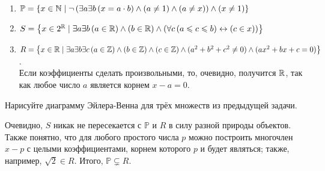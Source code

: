 \begin{Answer}
    \noindent
    \begin{enumerate}[label=\arabic*)]
    \item $ \mathbb{P} = \left \{ x \in \mathbb{N} \mid \neg \left( \exists a \exists b \, (x = a \cdot b) \wedge (a \neq 1) \wedge (a \neq x) \right) \wedge (x \neq 1) \right \} $
    \item $ S = \left\{ x \in 2^{\mathbb{R}} \mid \exists a \exists b \, (a \in \mathbb{R}) \wedge (b \in \mathbb{R}) \wedge \left( \forall c \, (a \leqslant c \leqslant b) \leftrightarrow (c \in x) \right) \right\} $
    \item $ R = \left\{ x \in \mathbb{R} \mid \exists a \exists b \exists c \, (a \in \mathbb{Z}) \wedge (b \in \mathbb{Z}) \wedge (c \in \mathbb{Z}) \wedge (a^2 + b^2 + c^2 \neq 0) \wedge (a x^2 + b x + c = 0) \right\} $.\\
          Если коэффициенты сделать произвольными, то, очевидно, получится $ \mathbb{R} $, так как любое число $ a $ является корнем $ x - a = 0 $.
    \end{enumerate}
\end{Answer}


\begin{Exercise}[counter=SecExercise]
    \noindent
    Нарисуйте диаграмму Эйлера-Венна для трёх множеств из предыдущей задачи.
\end{Exercise}

\begin{Answer}
    \noindent
    Очевидно, $ S $ никак не пересекается с $ \mathbb{P} $ и $ R $ в силу разной природы объектов.
    Также понятно, что для любого простого числа $ p $ можно построить многочлен $ x - p $ с целыми коэффициентами, корнем которого $ p $ и будет являться;
    также, например, $ \sqrt{2} \in R $.
    Итого, $ \mathbb{P} \varsubsetneq R $.

\end{Answer}


